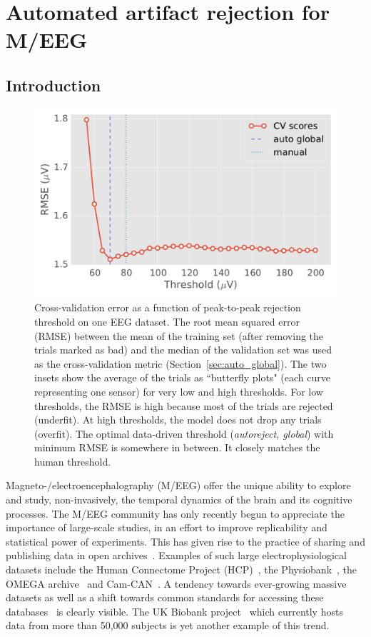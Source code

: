 \chapter{Automated artifact rejection for M/EEG}

\section{Introduction}
\label{sec:introduction}

\begin{figure}[t]
	\centering
	\includegraphics[width=0.55\linewidth]{figures/figure1.pdf}
    \caption{Cross-validation error as a function of peak-to-peak rejection threshold on one EEG dataset. The root mean squared error (RMSE) between the mean of the training set (after removing the trials marked as bad) and the median of the validation set was used as the cross-validation metric (Section~\ref{sec:auto_global}). The two insets show the average of the trials as ``butterfly plots" (each curve representing one sensor) for very low and high thresholds. For low thresholds, the RMSE is high because most of the trials are rejected (underfit). At high thresholds, the model does not drop any trials (overfit). The optimal data-driven threshold (\emph{autoreject, global}) with minimum RMSE is somewhere in between. It closely matches the human threshold.}
    \label{fig:cross_val}
\end{figure}

Magneto-/electroencephalography (M/EEG) offer the unique ability to explore
and study, non-invasively, the temporal dynamics of the brain and its cognitive processes. The M/EEG community has only recently begun to appreciate the importance of large-scale studies, in an effort to improve replicability and statistical power of experiments. This has given rise to the practice of sharing and publishing data in open archives~\citep{gorgolewski2016practical}. Examples of such large electrophysiological datasets include the Human Connectome Project (HCP)~\citep{van2012human, larson2013adding}, the Physiobank~\citep{goldberger2000physiobank}, the OMEGA archive~\citep{niso2016omega} and Cam-CAN~\citep{taylor2015cambridge}. A tendency towards ever-growing massive datasets as well as a shift towards common standards for accessing these databases~\citep{gorgolewski2016brain,bigdely2013hierarchical} is clearly visible. The UK Biobank project~\citep{ollier2005uk} which currently hosts data from more than 50,000 subjects is yet another example of this trend.

